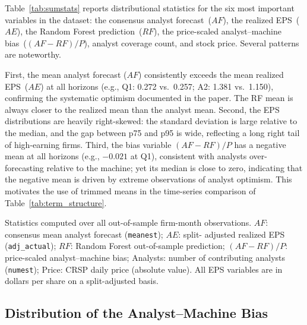 \documentclass[12pt]{article}
\begin{document}
Table~\ref{tab:sumstats} reports distributional statistics for the six most
important variables in the dataset: the consensus analyst forecast~($AF$),
the realized EPS~($AE$), the Random Forest prediction~($RF$), the price-scaled
analyst--machine bias~($(AF-RF)/P$), analyst coverage count, and stock price.
Several patterns are noteworthy.

First, the mean analyst forecast ($AF$) consistently exceeds the mean realized
EPS~($AE$) at all horizons (e.g., Q1: 0.272 vs.\ 0.257; A2: 1.381 vs.\
1.150), confirming the systematic optimism documented in the paper.  The RF
mean is always closer to the realized mean than the analyst mean.  Second,
the EPS distributions are heavily right-skewed: the standard deviation is
large relative to the median, and the gap between p75 and p95 is wide,
reflecting a long right tail of high-earning firms.  Third, the bias variable
$(AF-RF)/P$ has a negative mean at all horizons (e.g., $-0.021$ at Q1),
consistent with analysts over-forecasting relative to the machine; yet its
median is close to zero, indicating that the negative mean is driven by
extreme observations of analyst optimism.  This motivates the use of trimmed
means in the time-series comparison of Table~\ref{tab:term_structure}.

\begin{table}[H]
\centering
\caption{Descriptive Statistics for Key Variables by Forecast Horizon}
\label{tab:sumstats}
\begin{threeparttable}
\footnotesize

\begin{tablenotes}
  \footnotesize
  \item Statistics computed over all out-of-sample firm-month observations.
  $AF$: consensus mean analyst forecast (\texttt{meanest}); $AE$: split-
  adjusted realized EPS (\texttt{adj\_actual}); $RF$: Random Forest
  out-of-sample prediction; $(AF-RF)/P$: price-scaled analyst--machine bias;
  Analysts: number of contributing analysts (\texttt{numest});
  Price: CRSP daily price (absolute value).
  All EPS variables are in dollars per share on a split-adjusted basis.
\end{tablenotes}
\end{threeparttable}
\end{table}

\subsection{Distribution of the Analyst--Machine Bias}
\end{document}
